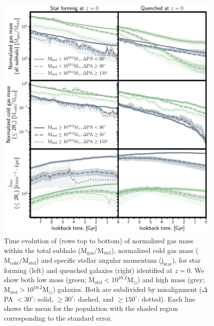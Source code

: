\begin{figure}
	\includegraphics[width=\linewidth]{misalignment_BH/time_evo_supplement_no_feedback.pdf}
    \caption{Time evolution of (rows top to bottom) of normalized gas mass within the total subhalo ($\mathrm{M_{gas}/M_{stel}}$), normalized cold gas mass ($\mathrm{M_{cold}/M_{stel}}$) and specific stellar angular momentum ($\mathrm{j_{star}}$), for star forming (left) and quenched galaxies (right) identified at $z=0$. We show both low mass (green; $\mathrm{M_{stel} < 10^{10.2}M_{\odot}}$) and high mass (grey; $\mathrm{M_{stel} > 10^{10.2}M_{\odot}}$) galaxies. Both are subdivided by misalignment ($\Delta$PA $< 30^{\circ}$: solid, $\geq 30^{\circ}$: dashed, and  $\geq 150^{\circ}$: dotted). Each line shows the mean for the population with the shaded region corresponding to the standard error.}
    \label{fig:overall_pop_additional}
\end{figure}

